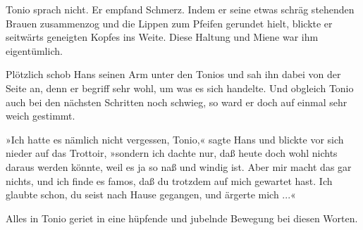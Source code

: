 \documentclass[twoside,DIV=calc,BCOR=5mm,12pt,ngerman,twocolumn]{scrartcl}
\begin{document}
Tonio sprach nicht. Er empfand Schmerz. Indem er seine etwas schräg
stehenden Brauen zusammenzog und die Lippen zum Pfeifen gerundet hielt,
blickte er seitwärts geneigten Kopfes ins Weite. Diese Haltung und Miene
war ihm eigentümlich.

Plötzlich schob Hans seinen Arm unter den Tonios und sah ihn dabei von
der Seite an, denn er begriff sehr wohl, um was es sich handelte. Und
obgleich Tonio auch bei den nächsten Schritten noch schwieg, so ward er
doch auf einmal sehr weich gestimmt.

»Ich hatte es nämlich nicht vergessen, Tonio,« sagte Hans und blickte
vor sich nieder auf das Trottoir, »sondern ich dachte nur, daß heute
doch wohl nichts daraus werden könnte, weil es ja so naß und windig ist.
Aber mir macht das gar nichts, und ich finde es famos, daß du trotzdem
auf mich gewartet hast. Ich glaubte schon, du seist nach Hause gegangen,
und ärgerte mich ...«

Alles in Tonio geriet in eine hüpfende und jubelnde Bewegung bei diesen
Worten.
\end{document}
